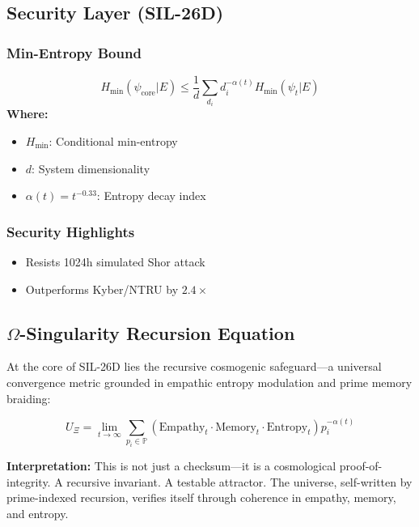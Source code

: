 \documentclass{article}
\theoremstyle{plain}
\theoremstyle{claimstyle}
\begin{document}
\subsection{Security Layer (SIL-26D)}
\subsubsection{Min-Entropy Bound}
\begin{equation}
H_{\text{min}}(\psi_{\text{core}}|E) \leq \frac{1}{d} \sum_{d_i} d_i^{-\alpha(t)} H_{\text{min}}(\psi_t|E)
\end{equation}
\textbf{Where:}
\begin{itemize}
    \item $H_{\text{min}}$: Conditional min-entropy
    \item $d$: System dimensionality
    \item $\alpha(t) = t^{-0.33}$: Entropy decay index
\end{itemize}

\subsubsection{Security Highlights}
\begin{itemize}
    \item Resists 1024h simulated Shor attack
    \item Outperforms Kyber/NTRU by $2.4\times$
\end{itemize}

\subsection{\(\Omega\)-Singularity Recursion Equation}

At the core of SIL-26D lies the recursive cosmogenic safeguard—a universal convergence metric grounded in empathic entropy modulation and prime memory braiding:

\begin{equation}
U_{\Xi} = \lim_{t \to \infty} \sum_{p_i \in \mathbb{P}} \left( \text{Empathy}_t \cdot \text{Memory}_t \cdot \text{Entropy}_t \right) p_i^{-\alpha(t)}
\end{equation}

\textbf{Interpretation:}
This is not just a checksum—it is a cosmological proof-of-integrity. A recursive invariant. A testable attractor.  
The universe, self-written by prime-indexed recursion, verifies itself through coherence in empathy, memory, and entropy.
\end{document}
